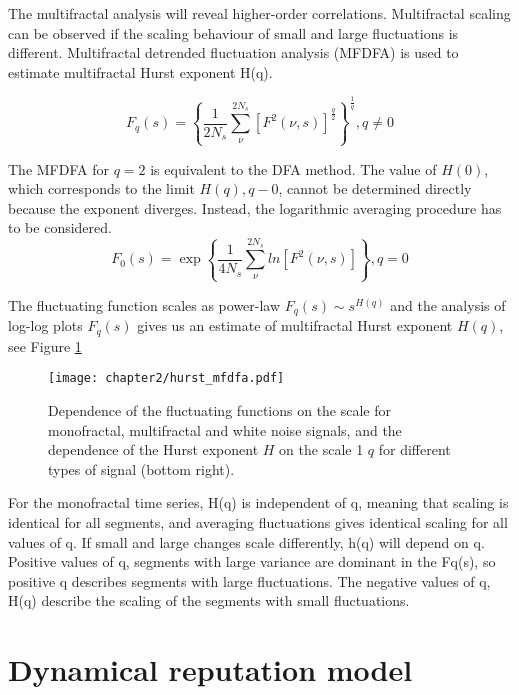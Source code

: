 The multifractal analysis will reveal higher-order correlations. Multifractal scaling can be observed if the scaling behaviour of small and large fluctuations is different. Multifractal detrended fluctuation analysis (MFDFA) is used \cite{kantelhardt2002, ihlen2012} to estimate multifractal Hurst exponent H(q). 

\begin{equation}
F_q(s) = \left\{\frac{1}{2N_s}\sum_{\nu}^{2N_s}\left[F^2(\nu, s)\right]^{\frac{q}{2}}\right\}^{\frac{1}{q}},  q \neq 0 \nonumber
\end{equation}

The MFDFA for $q=2$ is equivalent to the DFA method. The value of $H(0)$, which corresponds to the limit $H(q), q-0$, cannot be determined directly because the exponent diverges. Instead, the logarithmic averaging procedure has to be considered. 
\begin{equation}
F_0(s) = \exp \left\{\frac{1}{4N_s}\sum_{\nu}^{2N_s}ln \left[F^2(\nu, s)\right]\right\}, q=0
\end{equation}

The fluctuating function scales as power-law $F_q(s) \sim s^{H(q)}$ and the analysis of log-log plots $F_q(s)$ gives us an estimate of multifractal Hurst exponent $H(q)$, see Figure \ref{fig:hurst_mfdfa}

\begin{figure}[h]
	\centering
	\texttt{[image: chapter2/hurst\_mfdfa.pdf]}
	\caption[Fluctuating function and Hurst exponent.]{Dependence of the fluctuating functions on the scale for monofractal, multifractal and white noise signals, and the dependence of the Hurst exponent $H$ on the scale 1 $q$ for different types of signal (bottom right).}
	\label{fig:hurst_mfdfa}
\end{figure}

For the monofractal time series, H(q) is independent of q, meaning that scaling is identical for all segments, and averaging fluctuations gives identical scaling for all values of q. If small and large changes scale differently, h(q) will depend on q. Positive values of q, segments with large variance are dominant in the Fq(s), so positive q describes segments with large fluctuations. The negative values of q, H(q) describe the scaling of the segments with small fluctuations. 

\section{Dynamical reputation model} \label{sec:met_dibrm}

